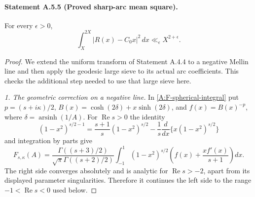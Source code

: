\paragraph{Statement A.5.5 (Proved sharp-arc mean square).}
For every $\epsilon>0$,
\begin{equation}\label{A:sharp-mean-square}
 \int_X^{2X}|R(x)-C_0x|^2\,dx\ll_\epsilon X^{2+\epsilon}.
\end{equation}
\begin{proof}
We extend the uniform transform of Statement A.4.4 to a negative
Mellin line and then apply the geodesic large sieve to its actual
arc coefficients. This checks the additional step needed to use that
large sieve here.

\emph{1. The geometric correction on a negative line.}
In \eqref{A:F-spherical-integral} put
$p=(s+i\kappa)/2$, $B(x)=\cosh(2\delta)+x\sinh(2\delta)$,
and $f(x)=B(x)^{-p}$, where $\delta=\operatorname{arsinh}(1/A)$.
For $\operatorname{Re}s>0$ the identity
\[
 (1-x^2)^{s/2-1}
 =\frac{s+1}{s}(1-x^2)^{s/2}
       -\frac1s\frac d{dx}\{x(1-x^2)^{s/2}\}
\]
and integration by parts give
\begin{equation}\label{A:F-regularized}
 F_{s,\kappa}(A)=
 \frac{\Gamma((s+3)/2)}{\sqrt\pi\Gamma((s+2)/2)}
 \int_{-1}^1(1-x^2)^{s/2}
       \left(f(x)+\frac{x f'(x)}{s+1}\right)dx.
\end{equation}
The right side converges absolutely and is analytic for
$\operatorname{Re}s>-2$, apart from its displayed parameter
singularities. Therefore it continues the left side to the range
$-1<\operatorname{Re}s<0$ used below.


\end{proof}
